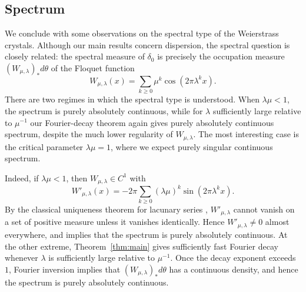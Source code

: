 \documentclass[11pt]{amsart}
\theoremstyle{plain}
\theoremstyle{definition}
\numberwithin{equation}{section}
\begin{document}



\subsection{Spectrum}

We conclude with some observations on the spectral type of the Weierstrass crystals. Although our main results concern dispersion, the spectral question is closely related: the spectral measure of $\delta_0$ is precisely the occupation measure $(W_{\mu,\lambda})_*d\theta$ of the Floquet function
$$
W_{\mu,\lambda}(x)=\sum_{k\geq0}\mu^k\cos(2\pi\lambda^k x).
$$
There are two regimes in which the spectral type is understood. When $\lambda\mu<1$, the spectrum is purely absolutely continuous, while for $\lambda$ sufficiently large relative to $\mu^{-1}$ our Fourier-decay theorem again gives purely absolutely continuous spectrum, despite the much lower regularity of $W_{\mu,\lambda}$. The most interesting case is the critical parameter $\lambda\mu=1$, where we expect purely singular continuous spectrum.

Indeed, if $\lambda\mu<1$, then $W_{\mu,\lambda}\in C^1$ with
$$
W'_{\mu,\lambda}(x)=-2\pi\sum_{k\geq0}(\lambda\mu)^k\sin(2\pi\lambda^k x).
$$
By the classical uniqueness theorem for lacunary series \cite[Theorem 6]{Zyg32}, $W'_{\mu,\lambda}$ cannot vanish on a set of positive measure unless it vanishes identically. Hence $W'_{\mu,\lambda}\neq0$ almost everywhere, and \cite[Theorem 6.3]{KernerPostSabriTaufer} implies that the spectrum is purely absolutely continuous. At the other extreme, Theorem~\ref{thm:main} gives sufficiently fast Fourier decay whenever $\lambda$ is sufficiently large relative to $\mu^{-1}$. Once the decay exponent exceeds $1$, Fourier inversion implies that $(W_{\mu,\lambda})_*d\theta$ has a continuous density, and hence the spectrum is purely absolutely continuous.
\end{document}

